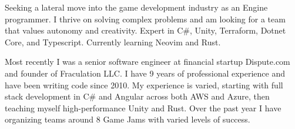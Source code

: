 

\begin{cvparagraph}


Seeking a lateral move into the game development industry as an Engine programmer.
I thrive on solving complex problems and am looking for a team that values autonomy and creativity.
Expert in C\#, Unity, Terraform, Dotnet Core, and Typescript. Currently learning Neovim and Rust. 

Most recently I was a senior software engineer at financial startup Dispute.com and founder of Fraculation LLC.\@
I have 9 years of professional experience and have been writing code since 2010. My experience is varied, starting with 
full stack development in C\# and Angular across both AWS and Azure, then teaching myself high-performance Unity and Rust.
Over the past year I have organizing teams around 8 Game Jams with varied levels of success.


\end{cvparagraph}
